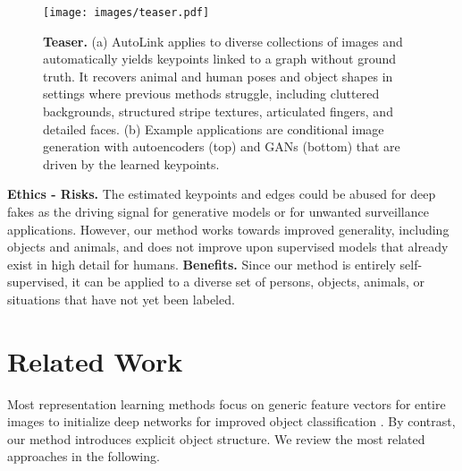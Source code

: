 \documentclass{article}
\begin{document}
\begin{figure}[t]
\begin{center}
  \texttt{[image: images/teaser.pdf]}
\end{center}
    \caption{\textbf{Teaser.}
    (a) AutoLink applies to diverse collections of images and automatically yields keypoints linked to a graph without ground truth. It recovers animal and human poses and object shapes in settings where previous methods struggle, including cluttered backgrounds, structured stripe textures, articulated fingers, and detailed faces. 
    (b) Example applications are conditional image generation with autoencoders (top) and GANs (bottom) that are driven by the learned keypoints.}
\label{fig:teaser}
\end{figure}



\textbf{Ethics - Risks.} \label{sec:ethics} The estimated keypoints and edges could be abused for deep fakes as the driving signal for generative models or for unwanted surveillance applications. However, our method works towards improved generality, including objects and animals, and does not improve upon supervised models that already exist in high detail for humans.
\textbf{Benefits.} Since our method is entirely self-supervised, it can be applied to a diverse set of persons, objects, animals, or situations that have not yet been labeled.




















%
 \section{Related Work}

Most representation learning methods focus on generic feature vectors for entire images to initialize deep networks for improved object classification \cite{wu2018unsupervised, chen2020simple, oord2018representation, he2020momentum, he2021masked}.
By contrast, our method introduces explicit object structure. We review the most related approaches in the following.
\end{document}
